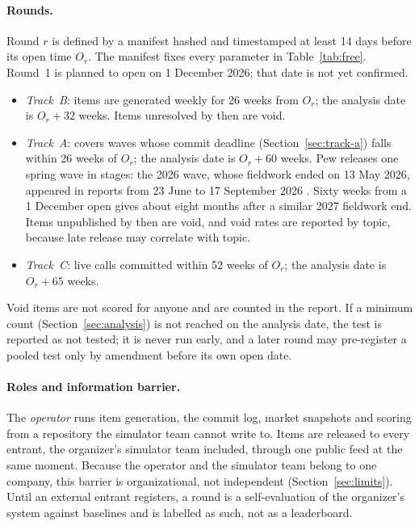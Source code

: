 \documentclass[11pt]{article}
\begin{document}
\paragraph{Rounds.} Round $r$ is defined by a manifest hashed and timestamped at least 14 days before its open time $O_r$. The manifest fixes every parameter in Table~\ref{tab:free}. Round~1 is planned to open on 1 December 2026; that date is not yet confirmed.
\begin{itemize}
  \item \emph{Track~B}: items are generated weekly for 26 weeks from $O_r$; the analysis date is $O_r + 32$ weeks. Items unresolved by then are void.
  \item \emph{Track~A}: covers waves whose commit deadline (Section~\ref{sec:track-a}) falls within 26 weeks of $O_r$; the analysis date is $O_r + 60$ weeks. Pew releases one spring wave in stages: the 2026 wave, whose fieldwork ended on 13 May 2026, appeared in reports from 23 June to 17 September 2026 \citep{pew2026methods,pew2026ai}. Sixty weeks from a 1 December open gives about eight months after a similar 2027 fieldwork end. Items unpublished by then are void, and void rates are reported by topic, because late release may correlate with topic.
  \item \emph{Track~C}: live calls committed within 52 weeks of $O_r$; the analysis date is $O_r + 65$ weeks.
\end{itemize}
Void items are not scored for anyone and are counted in the report. If a minimum count (Section~\ref{sec:analysis}) is not reached on the analysis date, the test is reported as not tested; it is never run early, and a later round may pre-register a pooled test only by amendment before its own open date.

\paragraph{Roles and information barrier.} The \emph{operator} runs item generation, the commit log, market snapshots and scoring from a repository the simulator team cannot write to. Items are released to every entrant, the organizer's simulator team included, through one public feed at the same moment. Because the operator and the simulator team belong to one company, this barrier is organizational, not independent (Section~\ref{sec:limits}). Until an external entrant registers, a round is a self-evaluation of the organizer's system against baselines and is labelled as such, not as a leaderboard.
\end{document}
